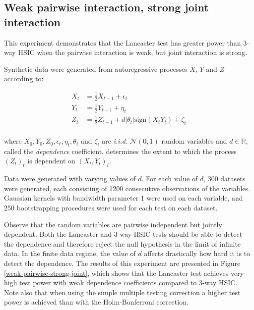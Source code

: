 \documentclass[]{article}
\begin{document}
\subsection{Weak pairwise interaction, strong joint interaction}\label{experiment1}

This experiment demonstrates that the Lancaster test has greater power than 3-way HSIC when the pairwise interaction is weak, but joint interaction is strong.


Synthetic data were generated from autoregressive processes $X$, $Y$ and $Z$ according to:

\begin{align*}
X_t &= \frac{1}{2}X_{t-1} + \epsilon_t\\
Y_t &= \frac{1}{2}Y_{t-1} + \eta_t\\
Z_t &= \frac{1}{2}Z_{t-1} + d |\theta_t|\text{sign}(X_t Y_t) + \zeta_t\\
\end{align*}

where $X_0, Y_0, Z_0, \epsilon_t, \eta_t, \theta_t$ and $\zeta_t$ are \emph{i.i.d.} $\mathcal{N}(0,1)$ random variables and $d\in\mathbb{R}$, called the \emph{dependence} coefficient, determines the extent to which the process $(Z_t)_t$ is dependent on $(X_t,Y_t)_t$.

Data were generated with varying values of $d$. For each value of $d$, 300 datasets were generated, each consisting of 1200 consecutive observations of the variables. Gaussian kernels with bandwidth parameter 1 were used on each variable, and 250 bootstrapping procedures were used for each test on each dataset.

Observe that the random variables are pairwise independent but jointly dependent. Both the Lancaster and 3-way HSIC tests should be able to detect the dependence and therefore reject the null hypothesis in the limit of infinite data. In the finite data regime, the value of $d$ affects drastically how hard it is to detect the dependence. The results of this experiment are presented in Figure \ref{weak-pairwise-strong-joint}, which shows that the Lancaster test achieves very high test power with weak dependence coefficients compared to 3-way HSIC. Note also that when using the simple multiple testing correction a higher test power is achieved than with the Holm-Bonferroni correction.
\end{document}
